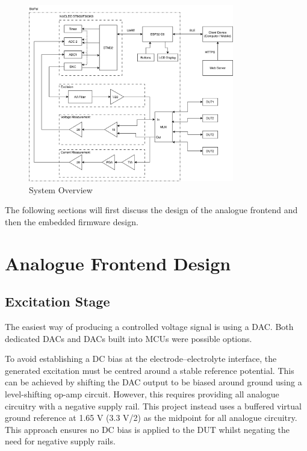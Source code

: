 
\begin{figure}[H]
    \centering
    \includegraphics[width=0.8\textwidth]{FullSystemOverview.png}
    \caption{System Overview}
    \label{fig:system_overview} 
\end{figure}

The following sections will first discuss the design of the analogue frontend and then the embedded firmware design.
\section{Analogue Frontend Design}

\subsection{Excitation Stage}\label{subsec:design_excitation}
The easiest way of producing a controlled voltage signal is using a \ac{DAC}. Both dedicated \acp{DAC} and \acp{DAC} built into \acp{MCU} were possible options.

To avoid establishing a DC bias at the electrode–electrolyte interface, the generated excitation must be centred around a stable reference potential. This can be achieved by shifting the \ac{DAC} output to be biased around ground using a level-shifting op-amp circuit. However, this requires providing all analogue circuitry with a negative supply rail. This project instead uses a buffered virtual ground reference at 1.65 V (3.3 V/2) as the midpoint for all analogue circuitry. This approach ensures no DC bias is applied to the \ac{DUT} whilst negating the need for negative supply rails.

